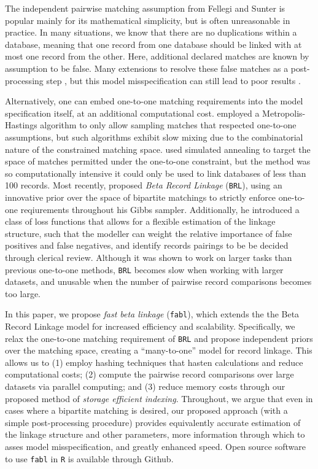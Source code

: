 \documentclass[12pt,letterpaper]{article}
\newcommand{\1}[1]{\mathbb{I}\!\left[#1\right]} %
\begin{document}
	The independent pairwise matching assumption from Fellegi and Sunter is popular mainly for its mathematical simplicity, but is often unreasonable in practice. In many situations, we know that there are no duplications within a database, meaning that one record from one database should be linked with at most one record from the other. Here, additional declared matches are known by assumption to be false. Many extensions to \cite{fellegi_theory_1969} resolve these false matches as a post-processing step \citep{jaro1989}, but this model misspecification can still lead to poor results \citep{sadinle_bayesian_2017}.
	
	Alternatively, one can embed one-to-one matching requirements into the model specification itself, at an additional computational cost. \cite{larsen2005} employed a Metropolis-Hastings algorithm to only allow sampling matches that respected one-to-one assumptions, but such algorithms exhibit slow mixing due to the combinatorial nature of the constrained matching space. \cite{fortunato_2010} used simulated annealing to target the space of matches permitted under the one-to-one constraint, but the method was so computationally intensive it could only be used to link databases of less than 100 records. Most recently, \cite{sadinle_bayesian_2017} proposed \emph{Beta Record Linkage} (\texttt{BRL}), using an innovative prior over the space of bipartite matchings to strictly enforce one-to-one reqiurements throughout his Gibbs sampler. Additionally, he introduced a class of loss functions that allows for a flexible estimation of the linkage structure, such that the modeller can weight the relative importance of false positives and false negatives, and identify records pairings to be be decided through clerical review. Although it was shown to work on larger tasks than previous one-to-one methods, \texttt{BRL} becomes slow when working with larger datasets, and unusable when the number of pairwise record comparisons becomes too large. 
	
	In this paper, we propose \emph{fast beta linkage} (\texttt{fabl}), which extends the the Beta Record Linkage model for increased efficiency and scalability. Specifically, we relax the one-to-one matching requirement of \texttt{BRL} and propose independent priors over the matching space, creating a ``many-to-one'' model for record linkage. This allows us to (1) employ hashing techniques that hasten calculations and reduce computational costs; (2) compute the pairwise record comparisons over large datasets via parallel computing; and (3) reduce memory costs through our proposed method of \emph{storage efficient indexing}. Throughout, we argue that even in cases where a bipartite matching is desired, our proposed approach (with a simple post-processing procedure) provides equivalently accurate estimation of the linkage structure and other parameters, more information through which to asses model misspecification, and greatly enhanced speed. Open source software to use \texttt{fabl} in \texttt{R} is available through Github. 
	
\end{document}
